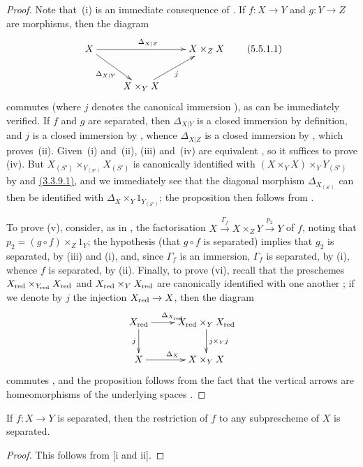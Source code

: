 \begin{proof}
\label{proof-1.5.5.1}
Note that~(i) is an immediate consequence of .
If $f:X\to Y$ and $g:Y\to Z$ are morphisms, then the diagram
\[
\label{1.5.5.1.1}
  \xymatrix{
    X\ar[rr]^{\Delta_{X|Z}}\ar[dr]_{\Delta_{X|Y}} & &
    X\times_Z X\\
    & X\times_Y X\ar[ur]_j
  }
  \tag{5.5.1.1}
\]
commutes (where $j$ denotes the canonical immersion ), as can be immediately verified.
If $f$ and $g$ are separated, then $\Delta_{X|Y}$ is a closed immersion by definition, and $j$ is a closed immersion by , whence $\Delta_{X|Z}$ is a closed immersion by , which
proves~(ii).
Given~(i) and~(ii), (iii) and~(iv) are equivalent , so it suffices to prove (iv).
But $X_{(S')}\times_{Y_{(S')}}X_{(S')}$ is canonically identified with $(X\times_Y X)\times_Y Y_{(S')}$ by  and \hyperref[1.3.3.9]{(3.3.9.1)}, and we immediately see that the diagonal morphism $\Delta_{X_{(S')}}$ can then be identified with $\Delta_X\times_Y 1_{Y_{(S')}}$;
the proposition then follows from .

To prove (v), consider, as in , the factorisation $X\xrightarrow{\Gamma_f}X\times_Z Y\xrightarrow{p_2}Y$ of $f$, noting that $p_2=(g\circ f)\times_Z 1_Y$;
the hypothesis (that $g\circ f$ is separated) implies that $g_2$ is separated, by (iii) and (i), and, since $\Gamma_f$ is an immersion, $\Gamma_f$ is separated, by (i), whence $f$ is separated, by (ii).
Finally, to prove (vi), recall that the preschemes $X_{\mathrm{red}}\times_{Y_{\mathrm{red}}}X_{\mathrm{red}}$ and $X_{\mathrm{red}}\times_Y X_{\mathrm{red}}$ are canonically identified with one another ;
if we denote by $j$ the injection $X_\red\to X$, then the diagram
\[
  \xymatrix{
    X_\red\ar[r]^{\Delta_{X_\red}}\ar[d]_j &
    X_\red\times_Y X_\red\ar[d]^{j\times_Y j}\\
    X\ar[r]^{\Delta_X} &
    X\times_Y X
  }
\]
commutes , and the proposition follows from the fact that the vertical arrows are homeomorphisms of the underlying spaces .
\end{proof}

\begin{corollary}[5.5.2]
\label{1.5.5.2}
If $f:X\to Y$ is separated, then the restriction of $f$ to any subprescheme of $X$ is separated.
\end{corollary}

\begin{proof}
\label{proof-1.5.5.2}
This follows from [i and ii].
\end{proof}

